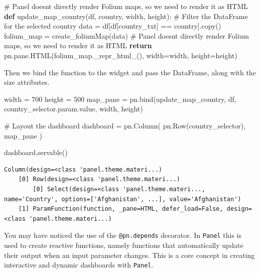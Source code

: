 \documentclass[
  letterpaper,
  DIV=11,
  numbers=noendperiod]{scrreprt}
\newenvironment{Shaded}{\begin{snugshade}}{\end{snugshade}}
\newcommand{\CommentTok}[1]{\textcolor[rgb]{0.37,0.37,0.37}{#1}}
\newcommand{\ControlFlowTok}[1]{\textcolor[rgb]{0.00,0.23,0.31}{\textbf{#1}}}
\newcommand{\DecValTok}[1]{\textcolor[rgb]{0.68,0.00,0.00}{#1}}
\newcommand{\KeywordTok}[1]{\textcolor[rgb]{0.00,0.23,0.31}{\textbf{#1}}}
\newcommand{\NormalTok}[1]{\textcolor[rgb]{0.00,0.23,0.31}{#1}}
\newcommand{\OperatorTok}[1]{\textcolor[rgb]{0.37,0.37,0.37}{#1}}
\newcommand{\StringTok}[1]{\textcolor[rgb]{0.13,0.47,0.30}{#1}}
\begin{document}
\begin{Shaded}
\begin{Highlighting}[]
\CommentTok{\# Panel doesn\textquotesingle{}t directly render Folium maps, so we need to render it as HTML}
\KeywordTok{def}\NormalTok{ update\_map\_country(df, country, width, height):}
    \CommentTok{\# Filter the DataFrame for the selected country}
\NormalTok{    data }\OperatorTok{=}\NormalTok{ df[df[}\StringTok{\textquotesingle{}country\_txt\textquotesingle{}}\NormalTok{] }\OperatorTok{==}\NormalTok{ country].copy()}
\NormalTok{    folium\_map }\OperatorTok{=}\NormalTok{ create\_foliumMap(data)}
    \CommentTok{\# Panel doesn\textquotesingle{}t directly render Folium maps, so we need to render it as HTML}
    \ControlFlowTok{return}\NormalTok{ pn.pane.HTML(folium\_map.\_repr\_html\_(), width}\OperatorTok{=}\NormalTok{width, height}\OperatorTok{=}\NormalTok{height)}
\end{Highlighting}
\end{Shaded}

Then we bind the function to the widget and pass the DataFrame, along
with the size attributes.

\begin{Shaded}
\begin{Highlighting}[]
\NormalTok{width }\OperatorTok{=} \DecValTok{700}
\NormalTok{height }\OperatorTok{=} \DecValTok{500}
\NormalTok{map\_pane }\OperatorTok{=}\NormalTok{ pn.bind(update\_map\_country, df,  country\_selector.param.value, width, height)}

\CommentTok{\# Layout the dashboard}
\NormalTok{dashboard }\OperatorTok{=}\NormalTok{ pn.Column(}
\NormalTok{    pn.Row(country\_selector),}
\NormalTok{    map\_pane}
\NormalTok{)}

\NormalTok{dashboard.servable()}
\end{Highlighting}
\end{Shaded}

\begin{verbatim}
Column(design=<class 'panel.theme.materi...)
    [0] Row(design=<class 'panel.theme.materi...)
        [0] Select(design=<class 'panel.theme.materi..., name='Country', options=['Afghanistan', ...], value='Afghanistan')
    [1] ParamFunction(function, _pane=HTML, defer_load=False, design=<class 'panel.theme.materi...)
\end{verbatim}

You may have noticed the use of the \texttt{@pn.depends} decorator. In
\texttt{Panel} this is used to create reactive functions, namely
functions that automatically update their output when an input parameter
changes. This is a core concept in creating interactive and dynamic
dashboards with \texttt{Panel}.
\end{document}
